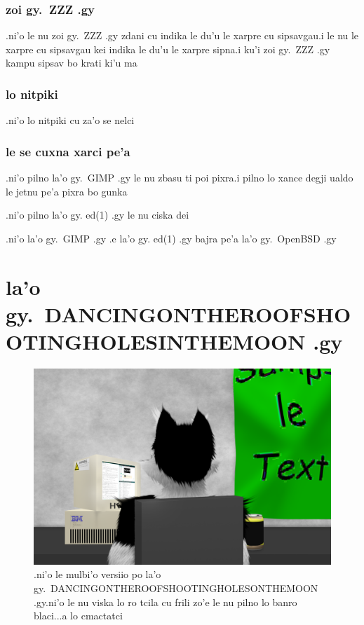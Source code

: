 \documentclass{report}
\begin{document}
\subsection{zoi gy.\ ZZZ .gy}
.ni'o le nu zoi gy.\ ZZZ .gy zdani cu indika le du'u le xarpre cu sipsavgau\@  .i le nu le xarpre cu sipsavgau kei indika le du'u le xarpre sipna\@  .i ku'i zoi gy.\ ZZZ .gy kampu sipsav bo krati ki'u ma
\subsection{lo nitpiki}
.ni'o lo nitpiki cu za'o se nelci
\subsection{le se cuxna xarci pe'a}
.ni'o pilno la'o gy.\ GIMP .gy le nu zbasu ti poi pixra\@  .i pilno lo xance degji ualdo le jetnu pe'a pixra bo gunka

.ni'o pilno la'o gy. ed(1) .gy le nu ciska dei

.ni'o la'o gy.\ GIMP .gy .e la'o gy. ed(1) .gy bajra pe'a la'o gy.\ OpenBSD .gy
\chapter{la'o gy.\ DANCINGONTHEROOFSHOOTINGHOLESINTHEMOON .gy}
\begin{figure}[ht]
	\centering
	\includegraphics[width=\textwidth]{dancingontheroofshootingholesinthemoon/dancingontheroofshootingholesinthemoon.png}
	\caption[center]{.ni'o le mulbi'o versiio po la'o gy.\ DANCINGONTHEROOFSHOOTINGHOLESONTHEMOON .gy\@  .ni'o le nu viska lo ro tcila cu frili zo'e le nu pilno lo banro blaci...a lo cmactatci}
\end{figure}
\end{document}
